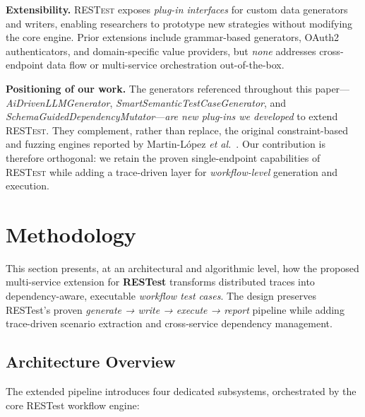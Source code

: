 \documentclass[conference]{IEEEtran}
\begin{document}
\textbf{Extensibility.}  
\textsc{RESTest} exposes \emph{plug-in interfaces} for custom data
generators and writers, enabling researchers to prototype new
strategies without modifying the core engine.  
Prior extensions include grammar-based generators, OAuth2
authenticators, and domain-specific value providers, but \emph{none}
addresses cross-endpoint data flow or multi-service orchestration
out-of-the-box.

\textbf{Positioning of our work.}  
The generators referenced throughout this paper—
\textit{AiDrivenLLMGenerator}, \textit{SmartSemanticTestCaseGenerator},
and \textit{SchemaGuidedDependencyMutator}—\emph{are new plug-ins we
developed} to extend \textsc{RESTest}.  
They complement, rather than replace, the original
constraint-based and fuzzing engines reported by
Martin-López \emph{et al.}~\cite{martin2019restest}.  
Our contribution is therefore orthogonal: we retain the proven
single-endpoint capabilities of \textsc{RESTest} while adding a
trace-driven layer for \emph{workflow-level} generation and execution.


\section{Methodology}\label{sec:method}
This section presents, at an architectural and algorithmic level, how the proposed multi-service extension for \textbf{RESTest} transforms distributed traces into dependency-aware, executable \emph{workflow test cases}.  The design preserves RESTest’s proven \textit{generate → write → execute → report} pipeline while adding trace-driven scenario extraction and cross-service dependency management.

\subsection{Architecture Overview}\label{ssec:arch}
The extended pipeline introduces four dedicated subsystems, orchestrated by
the core RESTest workflow engine:
\end{document}
